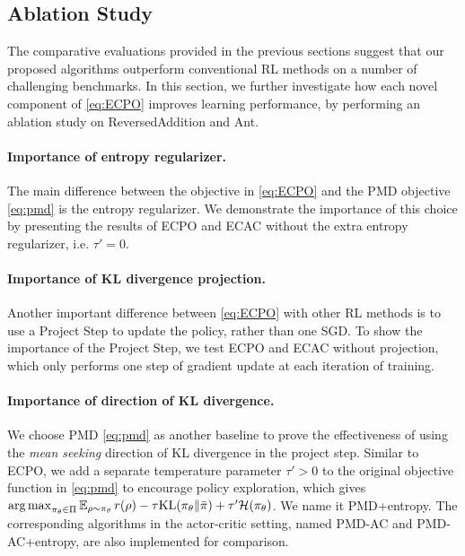 
\subsection{Ablation Study}
\label{subsec:ablationstudy}

The comparative evaluations provided in the previous sections suggest 
that our proposed algorithms 
outperform conventional RL methods on a number of challenging benchmarks.
In this section, we further investigate how each novel component of
\cref{eq:ECPO} improves learning performance,
by performing an ablation study on ReversedAddition and Ant.


\paragraph{Importance of entropy regularizer.} The main difference between the objective in \cref{eq:ECPO} and the PMD
objective \cref{eq:pmd} is the entropy regularizer.
We demonstrate the importance of this choice by presenting the results of ECPO and ECAC without the extra entropy regularizer, i.e. $\tau'=0$.

\paragraph{Importance of KL divergence projection.} Another important difference between \cref{eq:ECPO} with other RL methods
is to use a Project Step to update the policy,
rather than one SGD.
To show the importance of the Project Step,
we test ECPO and ECAC without projection,
which only performs one step of gradient update at each iteration of training. 

\paragraph{Importance of direction of KL divergence.} We choose PMD \cref{eq:pmd} as another baseline
to prove the effectiveness of using the \emph{mean seeking}
direction of KL divergence in the project step.
Similar to ECPO, we add a separate temperature parameter $\tau' > 0$
to the original objective function in \cref{eq:pmd}
to encourage policy exploration,
which gives
$\operatorname*{arg\,max}_{\pi_\theta \in \Pi}{ \operatorname*{\mathbb{E}}_{\rho \sim \pi_\theta}{  r(\rho)  - \tau \text{KL}(\pi_\theta \| \bar{\pi}) } + \tau'\mathcal{H}(\pi_\theta) }$.
We name it PMD+entropy.
The corresponding algorithms in the actor-critic setting,
named PMD-AC and PMD-AC+entropy, are also implemented for comparison.

